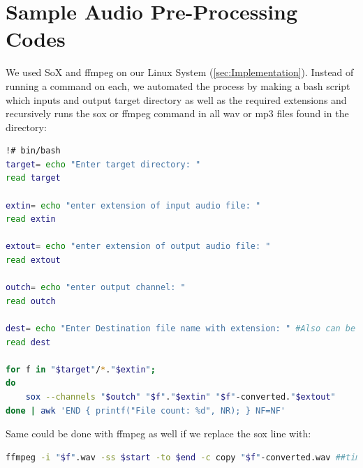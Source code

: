 \chapter{Sample Audio Pre-Processing Codes}
\label{App_B}

We used SoX and ffmpeg on our Linux System (\ref{sec:Implementation}). Instead of running a command on each, we automated the process by making a bash script which inputs  and output target directory as well as the required extensions and recursively runs the sox or ffmpeg command in all wav or mp3 files found in the directory:
\lstset{style=mycoding}
\begin{lstlisting}[language=bash, caption= Audio Pre-Processing (SoX)]
!# bin/bash
target= echo "Enter target directory: "
read target

extin= echo "enter extension of input audio file: "
read extin

extout= echo "enter extension of output audio file: "
read extout

outch= echo "enter output channel: "
read outch

dest= echo "Enter Destination file name with extension: " #Also can be used for customizing output file name along with extension
read dest

for f in "$target"/*."$extin";
do
    sox --channels "$outch" "$f"."$extin" "$f"-converted."$extout"    
done | awk 'END { printf("File count: %d", NR); } NF=NF' 
\end{lstlisting}


Same could be done with ffmpeg as well if we replace the sox line with:
\lstset{style=mycoding}
\begin{lstlisting}[language=bash, caption= Audio Pre-Processing (ffmpeg)]
ffmpeg -i "$f".wav -ss $start -to $end -c copy "$f"-converted.wav ##time format is 00:00:01 
\end{lstlisting}
 